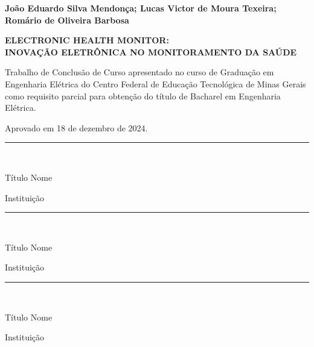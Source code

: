 \thispagestyle{empty}
\begin{titlepage}

\begin{center}

{\large \textbf{João Eduardo Silva Mendonça; Lucas Victor de Moura Texeira; Romário de Oliveira Barbosa}}

\vspace{4cm}

{\large \textbf{ELECTRONIC HEALTH MONITOR: \\ \vspace{0.5 cm} INOVAÇÃO ELETRÔNICA NO MONITORAMENTO DA SAÚDE}} \\
\vspace{0.7 cm}
\end{center}

\hspace{6.5cm}\begin{minipage}{8 cm}
     \nohyphens{Trabalho de Conclusão de Curso apresentado no curso de Graduação em Engenharia Elétrica do Centro Federal de Educação Tecnológica de Minas Gerais como requisito parcial para obtenção do título de Bacharel em Engenharia Elétrica.}


\end{minipage}

\vspace{1 cm}

Aprovado em 18 de dezembro de 2024.
\vspace{2 cm}

\begin{center}
\rule{10 cm}{1pt} \\
\vspace{0.3 cm}

Título Nome \\

\vspace{0.2 cm}

Instituição

\vspace{1 cm}

\rule{10 cm}{1pt} \\
\vspace{0.3 cm}

Título Nome \\

\vspace{0.2 cm}

Instituição

\vspace{1 cm}

\rule{10 cm}{1pt} \\
\vspace{0.3 cm}

Título Nome \\

\vspace{0.2 cm}

Instituição

\end{center}
\end{titlepage}